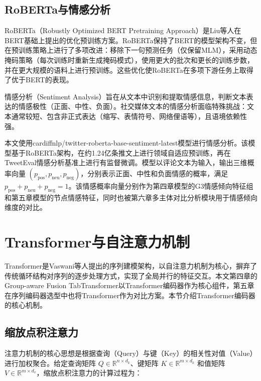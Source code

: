 \subsection{RoBERTa与情感分析}

RoBERTa（Robustly Optimized BERT Pretraining Approach）是Liu等人\cite{liu2019roberta}在BERT基础上提出的优化预训练方案。RoBERTa保持了BERT的模型架构不变，但在预训练策略上进行了多项改进：移除下一句预测任务（仅保留MLM），采用动态掩码策略（每次训练时重新生成掩码模式），使用更大的批次和更长的训练步数，并在更大规模的语料上进行预训练。这些优化使RoBERTa在多项下游任务上取得了优于BERT的表现。

情感分析（Sentiment Analysis）旨在从文本中识别和提取情感信息，判断文本表达的情感极性（正面、中性、负面）\cite{zhao2010sentiment}。社交媒体文本的情感分析面临特殊挑战：文本通常较短、包含非正式表达（缩写、表情符号、网络俚语等），且语境依赖性强\cite{chen2023emoji}。

本文使用cardiffnlp/twitter-roberta-base-sentiment-latest模型进行情感分析。该模型基于RoBERTa架构，在约1.24亿条推文上进行领域自适应预训练，再在TweetEval情感分析基准\cite{barbieri2020tweeteval}上进行有监督微调。模型以评论文本为输入，输出三维概率向量 $(p_{\text{pos}}, p_{\text{neu}}, p_{\text{neg}})$，分别表示正面、中性和负面情感的概率，满足 $p_{\text{pos}} + p_{\text{neu}} + p_{\text{neg}} = 1$。该情感概率向量分别作为第四章模型的G3情感倾向特征组和第五章模型的节点情感特征，同时也被第六章多主体对比分析模块用于情感倾向维度的对比。

\section{Transformer与自注意力机制}

Transformer是Vaswani等人\cite{vaswani2017attention}提出的序列建模架构，以自注意力机制为核心，摒弃了传统循环结构对序列的逐步处理方式，实现了全局并行的特征交互。本文第四章的Group-aware Fusion TabTransformer以Transformer编码器作为核心组件，第五章在序列编码器选型中也将Transformer作为对比方案。本节介绍Transformer编码器的核心机制。

\subsection{缩放点积注意力}

注意力机制的核心思想是根据查询（Query）与键（Key）的相关性对值（Value）进行加权聚合。给定查询矩阵 $Q \in \mathbb{R}^{n \times d_k}$、键矩阵 $K \in \mathbb{R}^{m \times d_k}$ 和值矩阵 $V \in \mathbb{R}^{m \times d_v}$，缩放点积注意力的计算过程为：

